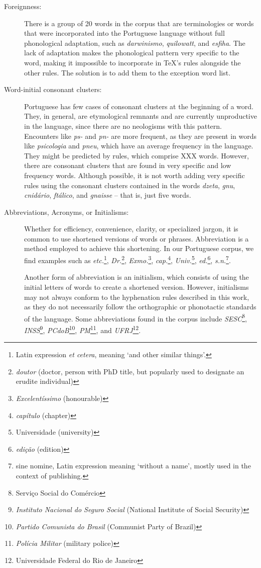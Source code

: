 \documentclass{article}
\begin{document}
\begin{description}
    \item[Foreignness:] There is a group of 20 words in the corpus that are
	terminologies or words that were incorporated into the Portuguese
	language without full phonological adaptation, such as
	\emph{darwinismo}, \emph{quilowatt}, and \emph{esfiha}. The lack of
	adaptation makes the phonological pattern very specific to the word,
	making it impossible to incorporate in \TeX{}'s rules alongside the
	other rules. The solution is to add them to the exception word list.

    \item[Word-initial consonant clusters:] Portuguese has few cases of
	consonant clusters at the beginning of a word. They, in general, are
	etymological remnants and are currently unproductive in the language,
	since there are no neologisms with this pattern. Encounters like
	\emph{ps-} and \emph{pn-} are more frequent, as they are present in
	words like \emph{psicologia} and \emph{pneu}, which have an average
	frequency in the language. They might be predicted by rules, which
	comprise XXX words. However, there are consonant clusters that are
	found in very specific and low frequency words. Although possible, it
	is not worth adding very specific rules using the consonant clusters
	contained in the words \emph{dzeta}, \emph{gnu}, \emph{cnidário},
	\emph{ftálico}, and \emph{gnaisse} -- that is, just five words.

    \item[Abbreviations, Acronyms, or Initialisms:] 
       Whether for efficiency, convenience, clarity, or specialized jargon, 
       it is common to use shortened versions of words or phrases. Abbreviation is a method employed to achieve this shortening. In our Portuguese corpus, we find examples such as 
       \emph{etc.}\footnote{Latin expression \emph{et cetera}, meaning `and other similar things'.}, 
       \emph{Dr.}\footnote{\emph{doutor} (doctor, person with PhD title, but popularly used to designate an erudite individual)}, 
       \emph{Exmo.}\footnote{\emph{Excelentíssimo} (honourable)},
       \emph{cap.}\footnote{\emph{capítulo} (chapter)}, \emph{Univ.}\footnote{Universidade (university)}, 
       \emph{ed.}\footnote{\emph{edição} (edition)}, 
       \emph{s.n.}\footnote{sine nomine, Latin expression meaning `without a name', mostly used in the context of publishing.}.

       Another form of abbreviation is an initialism, which consists of using
       the initial letters of words to create a shortened version. However,
       initialisms may not always conform to the hyphenation rules described in
       this work, as they do not necessarily follow the orthographic or
       phonotactic standards of the language. Some abbreviations found in the
       corpus include 
       \emph{SESC}\footnote{Serviço Social do Comércio}, 
       \emph{INSS}\footnote{\emph{Instituto Nacional do Seguro Social} (National Institute of Social Security)}, 
       \emph{PCdoB}\footnote{\emph{Partido Comunista do Brasil} (Communist Party of Brazil)},
       \emph{PM}\footnote{\emph{Polícia Militar} (military police)}, and 
       \emph{UFRJ}\footnote{Universidade Federal do Rio de Janeiro}.


\end{description}
\end{document}
